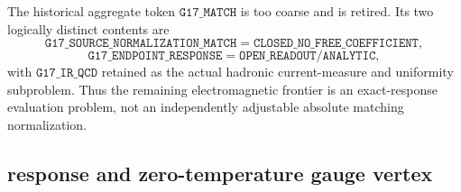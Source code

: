 \documentclass[12pt,a4paper]{article}
\begin{document}
\begin{corollary}
\label{p5c:cor:v275-g17-match-retired}
The historical aggregate token $\texttt{G17\_MATCH}$ is too coarse and is
retired.  Its two logically distinct contents are
\[
 \boxed{\texttt{G17\_SOURCE\_NORMALIZATION\_MATCH}
 =\texttt{CLOSED\_NO\_FREE\_COEFFICIENT},}
\]
\[
 \boxed{\texttt{G17\_ENDPOINT\_RESPONSE}
 =\texttt{OPEN\_READOUT/ANALYTIC},}
\]
with $\texttt{G17\_IR\_QCD}$ retained as the actual hadronic current-measure
and uniformity subproblem.  Thus the remaining electromagnetic frontier is an
exact-response evaluation problem, not an independently adjustable absolute
matching normalization.
\end{corollary}

\subsection{response and zero-temperature gauge vertex}
\label{p7:sec:v164-response-gauge-vertex}
\end{document}
